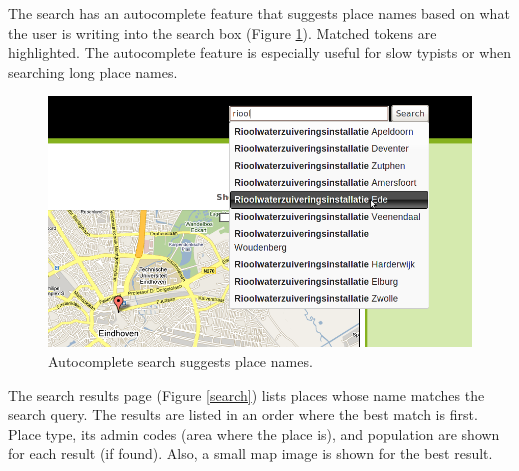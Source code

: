 \documentclass[a4paper,12pt]{article}
\begin{document}
\noindent The search has an autocomplete feature that suggests place
names based on what the user is writing into the search box (Figure
\ref{autocomplete}). Matched tokens are highlighted. The autocomplete
feature is especially useful for slow typists or when searching long
place names.

\begin{figure}[h]
  \includegraphics[width=\linewidth]{img/autocomplete.png}
  \caption{Autocomplete search suggests place names.}
  \label{autocomplete}
\end{figure}

The search results page (Figure \ref{search}) lists places whose name
matches the search query. The results are listed in an order where the
best match is first. Place type, its admin codes (area where the place
is), and population are shown for each result (if found). Also, a
small map image is shown for the best result.
\end{document}
